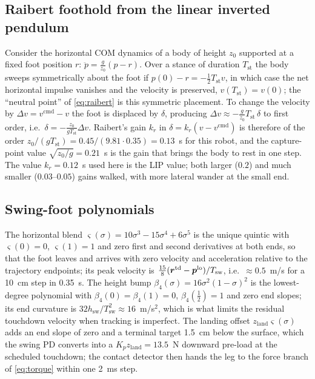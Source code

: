 \documentclass[11pt]{article}
\newcommand{\bp}{\bm{p}}\newcommand{\bv}{\bm{v}}\newcommand{\bom}{\bm{\omega}}\newcommand{\bth}{\bm{\theta}}
\newcommand{\ie}{i.e.}\newcommand{\eg}{e.g.}
\begin{document}
\subsection{Raibert foothold from the linear inverted pendulum}
Consider the horizontal COM dynamics of a body of height $z_0$ supported at a fixed foot position $r$: $\ddot p=\frac{g}{z_0}(p-r)$. Over a stance of duration $T_{\mathrm{st}}$ the body sweeps symmetrically about the foot if $p(0)-r=-\tfrac12T_{\mathrm{st}}v$, in which case the net horizontal impulse vanishes and the velocity is preserved, $v(T_{\mathrm{st}})=v(0)$; the ``neutral point'' of \eqref{eq:raibert} is this symmetric placement. To change the velocity by $\Delta v=v^{\mathrm{cmd}}-v$ the foot is displaced by $\delta$, producing $\Delta v\approx-\frac{g}{z_0}T_{\mathrm{st}}\,\delta$ to first order, \ie\ $\delta=-\frac{z_0}{gT_{\mathrm{st}}}\Delta v$. Raibert's gain $k_r$ in $\delta=k_r(v-v^{\mathrm{cmd}})$ is therefore of the order $z_0/(gT_{\mathrm{st}})=0.45/(9.81\cdot0.35)=0.13$~s for this robot, and the capture-point value $\sqrt{z_0/g}=0.21$~s is the gain that brings the body to rest in one step. The value $k_r=0.12$~s used here is the LIP value; both larger ($0.2$) and much smaller ($0.03$--$0.05$) gains walked, with more lateral wander at the small end.

\subsection{Swing-foot polynomials}
The horizontal blend $\varsigma(\sigma)=10\sigma^3-15\sigma^4+6\sigma^5$ is the unique quintic with $\varsigma(0)=0$, $\varsigma(1)=1$ and zero first and second derivatives at both ends, so that the foot leaves and arrives with zero velocity and acceleration relative to the trajectory endpoints; its peak velocity is $\tfrac{15}{8}(\br^{\mathrm{td}}-\bp^{\mathrm{lo}})/T_{\mathrm{sw}}$, \ie\ $\approx0.5$~m/s for a 10~cm step in 0.35~s. The height bump $\beta_4(\sigma)=16\sigma^2(1-\sigma)^2$ is the lowest-degree polynomial with $\beta_4(0)=\beta_4(1)=0$, $\beta_4(\tfrac12)=1$ and zero end slopes; its end curvature is $32h_{\mathrm{sw}}/T_{\mathrm{sw}}^2\approx16$~m/s$^2$, which is what limits the residual touchdown velocity when tracking is imperfect. The landing offset $z_{\mathrm{land}}\varsigma(\sigma)$ adds an end slope of zero and a terminal target 1.5~cm below the surface, which the swing PD converts into a $K_pz_{\mathrm{land}}=13.5$~N downward pre-load at the scheduled touchdown; the contact detector then hands the leg to the force branch of \eqref{eq:torque} within one 2~ms step.
\end{document}
